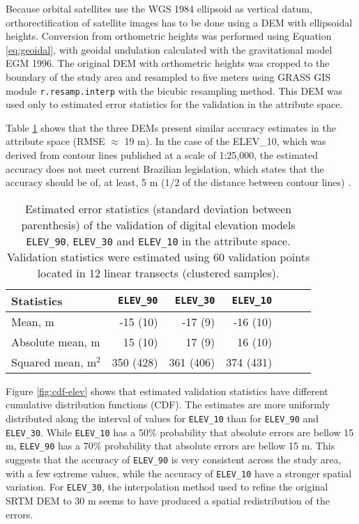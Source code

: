 Because orbital satellites use the WGS 1984 ellipsoid as vertical datum, orthorectification of satellite images has to be done using a DEM with ellipsoidal heights. Conversion from orthometric heights was performed using Equation \ref{eq:geoidal}, with geoidal undulation calculated with the gravitational model EGM 1996. The original DEM with orthometric heights was cropped to the boundary of the study area and resampled to five meters using GRASS GIS module \texttt{r.resamp.interp} with the bicubic resampling method. This DEM was used only to estimated error statistics for the validation in the attribute space.

Table \ref{tab:dem-attr-val} shows that the three DEMs present similar accuracy estimates in the attribute space (RMSE $\approx$ 19 m). In the case of the ELEV\_10, which was derived from contour lines published at a scale of 1:25,000, the estimated accuracy does not meet current Brazilian legislation, which states that the accuracy should be of, at least, 5 m (1/2 of the distance between contour lines) \cite{Brasil1984}.
 
\begin{table}[ht]
  \caption{Estimated error statistics (standard deviation between parenthesis) of the validation of digital elevation models \texttt{ELEV\_90}, \texttt{ELEV\_30} and \texttt{ELEV\_10} in the attribute space. Validation statistics were estimated using 60 validation points located in 12 linear transects (clustered samples).}
  \label{tab:dem-attr-val}
  \centering
  {\small
  \begin{tabular}{lrrrrrr}
    \hline
    Statistics           & \texttt{ELEV\_90} & \texttt{ELEV\_30} & \texttt{ELEV\_10} \\
    \hline
    Mean, m              & -15 (10)          & -17 (9)           & -16 (10)          \\ 
    Absolute mean, m     & 15  (10)          & 17  (9)           & 16  (10)          \\ 
    Squared mean, m$^2$  & 350 (428)         & 361 (406)         & 374 (431)         \\ 
    \hline
  \end{tabular}}
\end{table}

Figure \ref{fig:cdf-elev} shows that estimated validation statistics have different cumulative distribution functions (CDF). The estimates are more uniformly distributed along the interval of values for \texttt{ELEV\_10} than for \texttt{ELEV\_90} and \texttt{ELEV\_30}. While \texttt{ELEV\_10} has a 50\% probability that absolute errors are bellow 15 m, \texttt{ELEV\_90} has a 70\% probability that absolute errors are bellow 15 m. This suggests that the accuracy of \texttt{ELEV\_90} is very consistent across the study area, with a few extreme values, while the accuracy of \texttt{ELEV\_10} have a stronger spatial variation. For \texttt{ELEV\_30}, the interpolation method used to refine the original SRTM DEM to 30 m \cite{ValerianoEtAl2012} seems to have produced a spatial redistribution of the errors.

